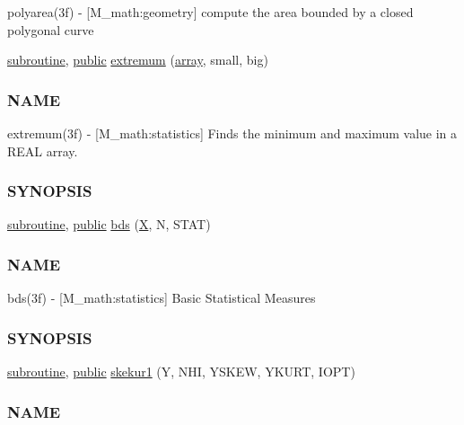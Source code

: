 \begin{DoxyCompactItemize}
\begin{DoxyCompactList}
polyarea(3f) -\/ \mbox{[}M\+\_\+math\+:geometry\mbox{]} compute the area bounded by a closed polygonal curve \end{DoxyCompactList}\item 
\hyperlink{M__stopwatch_83_8txt_acfbcff50169d691ff02d4a123ed70482}{subroutine}, \hyperlink{M__stopwatch_83_8txt_a2f74811300c361e53b430611a7d1769f}{public} \hyperlink{namespacem__math_a70e89987b4dfc6f42864fb9c6907b5b1}{extremum} (\hyperlink{intro__blas1_83_8txt_a89db1945e1a335ab0184c6a097821e32}{array}, small, big)
\begin{DoxyCompactList}\small\item\em \subsubsection*{N\+A\+ME}

extremum(3f) -\/ \mbox{[}M\+\_\+math\+:statistics\mbox{]} Finds the minimum and maximum value in a R\+E\+AL array. \subsubsection*{S\+Y\+N\+O\+P\+S\+IS}\end{DoxyCompactList}\item 
\hyperlink{M__stopwatch_83_8txt_acfbcff50169d691ff02d4a123ed70482}{subroutine}, \hyperlink{M__stopwatch_83_8txt_a2f74811300c361e53b430611a7d1769f}{public} \hyperlink{namespacem__math_a5298e196ca91a45fd9cff36e1b8e188a}{bds} (\hyperlink{intro__blas1_83_8txt_ac8596739bc875e90fe6e2ecf98e87906}{X}, N, S\+T\+AT)
\begin{DoxyCompactList}\small\item\em \subsubsection*{N\+A\+ME}

bds(3f) -\/ \mbox{[}M\+\_\+math\+:statistics\mbox{]} Basic Statistical Measures \subsubsection*{S\+Y\+N\+O\+P\+S\+IS}\end{DoxyCompactList}\item 
\hyperlink{M__stopwatch_83_8txt_acfbcff50169d691ff02d4a123ed70482}{subroutine}, \hyperlink{M__stopwatch_83_8txt_a2f74811300c361e53b430611a7d1769f}{public} \hyperlink{namespacem__math_a386a33c25fa5142ea1c6d45d3beae042}{skekur1} (Y, N\+HI, Y\+S\+K\+EW, Y\+K\+U\+RT, I\+O\+PT)
\begin{DoxyCompactList}\small\item\em \subsubsection*{N\+A\+ME}


\end{DoxyCompactList}
\end{DoxyCompactItemize}
